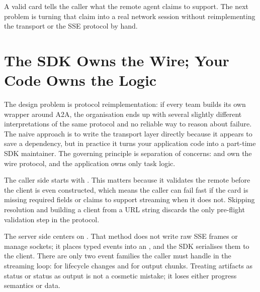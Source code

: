 A valid card tells the caller what the remote agent claims to support. The
next problem is turning that claim into a real network session without
reimplementing the transport or the SSE protocol by hand.


\section{The SDK Owns the Wire; Your Code Owns the Logic}
\label{sec:a2a-sdk}

The design problem is protocol reimplementation: if every team builds its
own  wrapper around A2A, the organisation ends up with several
slightly different interpretations of the same protocol and no reliable way
to reason about failure. The naive approach is to write the transport
layer directly because it appears to save a dependency, but in practice it
turns your application code into a part-time SDK maintainer. The governing
principle is separation of concerns:  and
 own the wire protocol, and the application
owns only task logic.

The caller side starts with . This matters because
it validates the remote  before the client is even
constructed, which means the caller can fail fast if the card is missing
required fields or claims to support streaming when it does not. Skipping
resolution and building a client from a URL string discards the only
pre-flight validation step in the protocol.

The server side centers on . That method
does not write raw SSE frames or manage sockets; it places typed events
into an , and the SDK serialises them to the client.
There are only two event families the caller must handle in the streaming
loop:  for lifecycle changes and
 for output chunks. Treating artifacts as
status or status as output is not a cosmetic mistake; it loses either
progress semantics or data.

